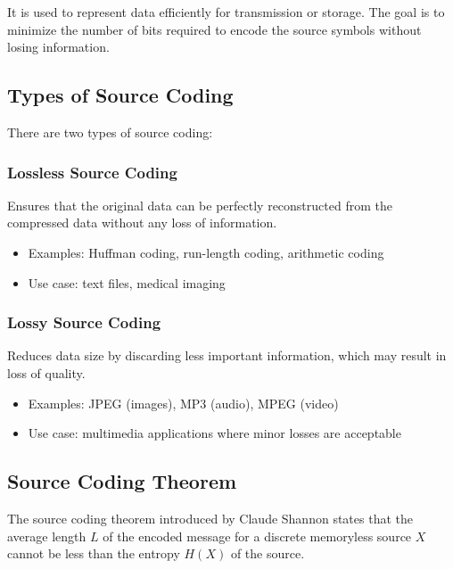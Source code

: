 \documentclass[11pt,a4paper]{book}
\newenvironment{definitionbox}[1][Definition]{%
    \begin{tcolorbox}[
        enhanced,
        breakable,
        colback=primaryblue!10,
        colframe=primaryblue!150,
        title=#1,
        fonttitle=\bfseries,
        sharp corners,
        boxrule=0.8pt,
        left=8pt,
        right=8pt,
        top=6pt,
        bottom=6pt
    ]
}{\end{tcolorbox}}
\begin{document}
It is used to represent data efficiently for transmission or storage. The goal is to minimize the number of bits required to encode the source symbols without losing information.

\subsection{Types of Source Coding}

There are two types of source coding:

\subsubsection{Lossless Source Coding}

\begin{definitionbox}[Lossless Source Coding]
Ensures that the original data can be perfectly reconstructed from the compressed data without any loss of information.
\end{definitionbox}

\begin{itemize}
    \item Examples: Huffman coding, run-length coding, arithmetic coding
    \item Use case: text files, medical imaging
\end{itemize}

\subsubsection{Lossy Source Coding}

\begin{definitionbox}[Lossy Source Coding]
Reduces data size by discarding less important information, which may result in loss of quality.
\end{definitionbox}

\begin{itemize}
    \item Examples: JPEG (images), MP3 (audio), MPEG (video)
    \item Use case: multimedia applications where minor losses are acceptable
\end{itemize}

\subsection{Source Coding Theorem}

\begin{definitionbox}[Source Coding Theorem]
The source coding theorem introduced by Claude Shannon states that the average length \(L\) of the encoded message for a discrete memoryless source \(X\) cannot be less than the entropy \(H(X)\) of the source.
\end{definitionbox}
\end{document}
